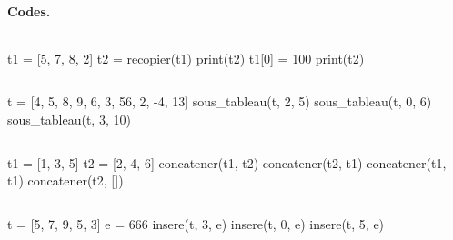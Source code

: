 \documentclass[12pt]{article}                   %
\theoremstyle{exercicestyle}
\theoremstyle{break2}
\theoremstyle{break3}
\begin{document}
\pagebreak

\paragraph{Codes.}
\inputminted[frame=single, framesep=2mm, label=Code Source - Recopier,linenos=true]{python}{./pyfiles/snippet-recopier.py}
\begin{pyconsole}[][numbers=left,frame=single,label=Console Python]
t1 = [5, 7, 8, 2]
t2 = recopier(t1)
print(t2)
t1[0] = 100
print(t2)
\end{pyconsole}
\inputminted[frame=single, framesep=2mm, label=Code Source - Sous-tableaux,linenos=true]{python}{./pyfiles/snippet-sous-tableau.py}
\begin{pyconsole}[][numbers=left,frame=single,label=Console Python]
t = [4, 5, 8, 9, 6, 3, 56, 2, -4, 13]
sous_tableau(t, 2, 5)
sous_tableau(t, 0, 6)
sous_tableau(t, 3, 10)
\end{pyconsole}
\inputminted[frame=single, framesep=2mm, label=Code Source - Concaténer,linenos=true]{python}{./pyfiles/snippet-concatener.py}
\begin{pyconsole}[][numbers=left,frame=single,label=Console Python]
t1 = [1, 3, 5]
t2 = [2, 4, 6]
concatener(t1, t2)
concatener(t2, t1)
concatener(t1, t1)
concatener(t2, [])
\end{pyconsole}
\inputminted[frame=single, framesep=2mm, label=Code Source - Insérer,linenos=true]{python}{./pyfiles/snippet-insere.py}
\begin{pyconsole}[][numbers=left,frame=single,label=Console Python]
t = [5, 7, 9, 5, 3]
e = 666
insere(t, 3, e)
insere(t, 0, e)
insere(t, 5, e)
\end{pyconsole}
\end{document}
